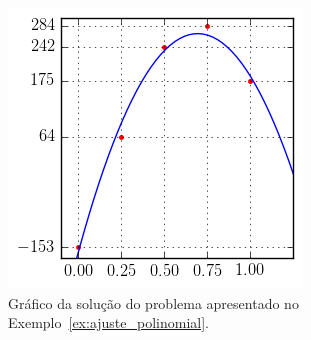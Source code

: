 \begin{figure}
  \centering
  \includegraphics{cap_ajuste/pics/ex_ajuste_polinomial/ex_ajuste_polinomial}
  \caption{Gráfico da solução do problema apresentado no Exemplo~\ref{ex:ajuste_polinomial}.}
  \label{fig:ex_ajuste_polinomial}
\end{figure}


